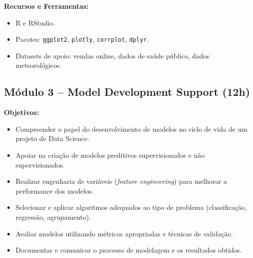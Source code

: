 \documentclass[12pt]{article}
\begin{document}
\textbf{Recursos e Ferramentas:}
\begin{itemize}
  \item R e RStudio.
  \item Pacotes: \texttt{ggplot2}, \texttt{plotly}, \texttt{corrplot}, \texttt{dplyr}.
  \item Datasets de apoio: vendas online, dados de saúde pública, dados meteorológicos.
\end{itemize}



%


\subsection*{Módulo 3 – Model Development Support (12h)}

\textbf{Objetivos:}
\begin{itemize}
  \item Compreender o papel do desenvolvimento de modelos no ciclo de vida de um projeto de Data Science.
  \item Apoiar na criação de modelos preditivos supervisionados e não supervisionados.
  \item Realizar engenharia de variáveis (\textit{feature engineering}) para melhorar a performance dos modelos.
  \item Selecionar e aplicar algoritmos adequados ao tipo de problema (classificação, regressão, agrupamento).
  \item Avaliar modelos utilizando métricas apropriadas e técnicas de validação.
  \item Documentar e comunicar o processo de modelagem e os resultados obtidos.
\end{itemize}
\end{document}
